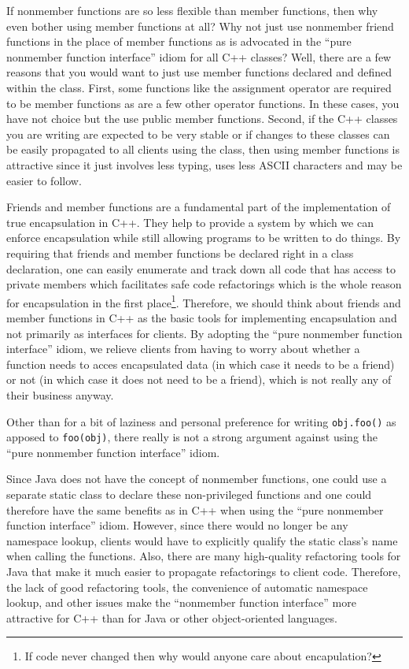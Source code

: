 \documentclass[pdf,ps2pdf,11pt]{SANDreport}
\begin{document}
If nonmember functions are so less flexible than member functions, then why
even bother using member functions at all?  Why not just use nonmember friend
functions in the place of member functions as is advocated in the ``pure
nonmember function interface'' idiom for all C++ classes?  Well, there are a
few reasons that you would want to just use member functions declared and
defined within the class.  First, some functions like the assignment operator
are required to be member functions as are a few other operator functions.  In
these cases, you have not choice but the use public member functions.  Second,
if the C++ classes you are writing are expected to be very stable or if
changes to these classes can be easily propagated to all clients using the
class, then using member functions is attractive since it just involves less
typing, uses less ASCII characters and may be easier to follow.

Friends and member functions are a fundamental part of the implementation of
true encapsulation in C++.  They help to provide a system by which we can
enforce encapsulation while still allowing programs to be written to do
things.  By requiring that friends and member functions be declared right in a
class declaration, one can easily enumerate and track down all code that has
access to private members which facilitates safe code refactorings which is
the whole reason for encapsulation in the first place\footnote{If code never
changed then why would anyone care about encapulation?}.  Therefore, we should
think about friends and member functions in C++ as the basic tools for
implementing encapsulation and not primarily as interfaces for clients.  By
adopting the ``pure nonmember function interface'' idiom, we relieve clients
from having to worry about whether a function needs to acces encapsulated data
(in which case it needs to be a friend) or not (in which case it does not need
to be a friend), which is not really any of their business anyway.

Other than for a bit of laziness and personal preference for writing
{}\texttt{obj.foo()} as apposed to {}\texttt{foo(obj)}, there really is not a
strong argument against using the ``pure nonmember function interface'' idiom.

Since Java does not have the concept of nonmember functions, one could use a
separate static class to declare these non-privileged functions and one could
therefore have the same benefits as in C++ when using the ``pure nonmember
function interface'' idiom.  However, since there would no longer be any
namespace lookup, clients would have to explicitly qualify the static class's
name when calling the functions.  Also, there are many high-quality
refactoring tools for Java that make it much easier to propagate refactorings
to client code.  Therefore, the lack of good refactoring tools, the
convenience of automatic namespace lookup, and other issues make the
``nonmember function interface'' more attractive for C++ than for Java or
other object-oriented languages.
\end{document}
